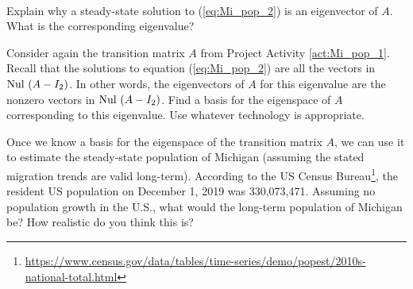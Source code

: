 \begin{pactivity}  ~
\ba
\item Explain why a steady-state solution to (\ref{eq:Mi_pop_2}) is an eigenvector of $A$. What is the corresponding eigenvalue? 


\item Consider again the transition matrix $A$ from Project Activity \ref{act:Mi_pop_1}. Recall that the solutions to equation (\ref{eq:Mi_pop_2}) are all the vectors in $\text{Nul } (A-I_2)$. In other words, the eigenvectors of $A$ for this eigenvalue are the nonzero vectors in $\text{Nul } (A-I_2)$. Find a basis for the eigenspace of $A$ corresponding to this eigenvalue. Use whatever technology is appropriate. 

\item Once we know a basis for the eigenspace of the transition matrix $A$, we can use it to estimate the steady-state population of Michigan (assuming the stated migration trends are valid long-term). According to the US Census Bureau\footnote{\url{https://www.census.gov/data/tables/time-series/demo/popest/2010s-national-total.html}}, the resident US population on December 1, 2019 was 330,073,471. Assuming no population growth in the U.S., what would the long-term population of Michigan be? How realistic do you think this is? 

 
\ea

\end{pactivity}

